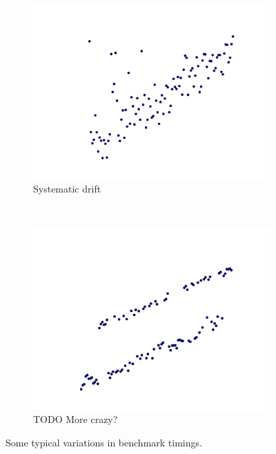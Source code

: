 \documentclass[conference]{IEEEtran}
\begin{document}
\begin{figure}
\begin{subfigure}{0.22\textwidth}
    \centering
    \includegraphics[width=\textwidth]{figures/fig1/drift_manyallocs_slow}
    \caption{Systematic drift}
\end{subfigure}
~
\begin{subfigure}{0.22\textwidth}
    \centering
    \includegraphics[width=\textwidth]{figures/fig1/bimodal_drift_sumindex}
    \caption{TODO More crazy?}
\end{subfigure}

\caption{Some typical variations in benchmark timings.}
\label{fig:examplebenchmarks}
\end{figure}
\end{document}
